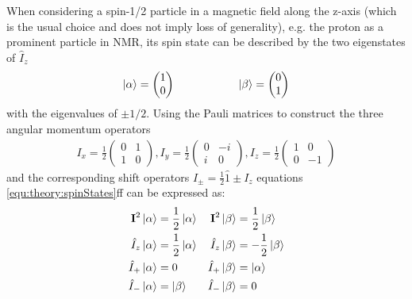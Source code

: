             When considering a spin-1/2 particle in a magnetic field along the z-axis (which is the usual choice and does not imply loss of generality), e.g. the proton as a prominent particle in NMR, its spin state can be described by the two eigenstates of $\hat{I}_z$ 
            \begin{equation}
            \ket\alpha = \begin{pmatrix}1\\0\end{pmatrix} \hspace{2 cm} \ket\beta =
            \begin{pmatrix}0\\1\end{pmatrix}
            \end{equation}
            with the eigenvalues of $\pm 1/2$. Using the Pauli matrices to construct the three angular momentum operators
            \begin{align*}
                I_x = \frac{1}{2}
                \begin{pmatrix}
                    0 & 1\\
                    1 & 0
                \end{pmatrix}, 
                I_y = \frac{1}{2}
                \begin{pmatrix}
                    0 & -i\\
                    i & 0
                \end{pmatrix}, 
                I_z = \frac{1}{2}
                \begin{pmatrix}
                    1 & 0\\
                    0 & -1
                \end{pmatrix} 
            \end{align*}
            and the corresponding shift operators $I_\pm = \frac{1}{2} \hat 1 \pm I_z$ equations \ref{equ:theory:spinStates}ff can be expressed as:
            \begin{align*}
                \mathbf{I}^2 \ket{\alpha} &= \frac{1}{2}\ket{\alpha}&\mathbf{I}^2 \ket{\beta} &= \frac{1}{2}\ket{\beta}\\
                \hat{I}_z\ket\alpha &= \frac{1}{2}\ket\alpha &\hat{I}_z\ket\beta &= -\frac{1}{2}\ket\beta\\
                \hat{I}_+\ket\alpha &= 0 &\hat{I}_+\ket\beta &= \ket\alpha\\
                \hat{I}_-\ket\alpha &= \ket\beta& \hat{I}_-\ket\beta &= 0
            \end{align*}
